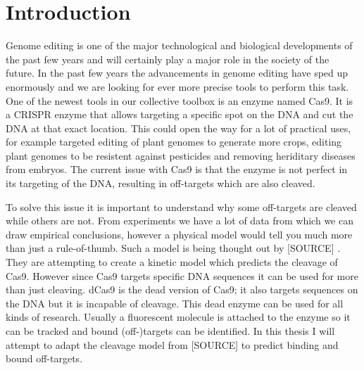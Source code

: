 \chapter{Introduction}

Genome editing is one of the major technological and biological developments of the past few years and will certainly play a major role in the society of the future. In the past few years the advancements in genome editing have sped up enormously and we are looking for ever more precise tools to perform this task. One of the newest tools in our collective toolbox is an enzyme named Cas9. It is a CRISPR enzyme that allows targeting a specific spot on the DNA and cut the DNA at that exact location. This could open the way for a lot of practical uses, for example targeted editing of plant genomes to generate more crops, editing plant genomes to be resistent against pesticides and removing heriditary diseases from embryos. The current issue with Cas9 is that the enzyme is not perfect in its targeting of the DNA, resulting in off-targets which are also cleaved.

To solve this issue it is important to understand why some off-targets are cleaved while others are not. From experiments we have a lot of data from which we can draw empirical conclusions, however a physical model would tell you much more than just a rule-of-thumb. Such a model is being thought out by [SOURCE] . They are attempting to create a kinetic model which predicts the cleavage of Cas9. However since Cas9 targets specific DNA sequences it can be used for more than just cleaving. dCas9 is the dead version of Cas9; it also targets sequences on the DNA but it is incapable of cleavage. This dead enzyme can be used for all kinds of research. Usually a fluorescent molecule is attached to the enzyme so it can be tracked and bound (off-)targets can be identified. In this thesis I will attempt to adapt the cleavage model from [SOURCE] to predict binding and bound off-targets.